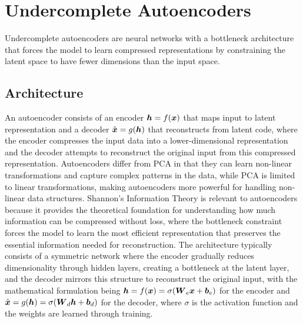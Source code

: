 
\section{Undercomplete Autoencoders }
\label{sec:undercomplete-ae}

Undercomplete autoencoders are neural networks with a bottleneck architecture that forces the model to learn compressed representations by constraining the latent space to have fewer dimensions than the input space.

\subsection{Architecture}

An autoencoder consists of an encoder $\boldsymbol{h} = f(\boldsymbol{x})$ that maps input to latent representation and a decoder $\hat{\boldsymbol{x}} = g(\boldsymbol{h})$ that reconstructs from latent code, where the encoder compresses the input data into a lower-dimensional representation and the decoder attempts to reconstruct the original input from this compressed representation. Autoencoders differ from PCA in that they can learn non-linear transformations and capture complex patterns in the data, while PCA is limited to linear transformations, making autoencoders more powerful for handling non-linear data structures. Shannon's Information Theory is relevant to autoencoders because it provides the theoretical foundation for understanding how much information can be compressed without loss, where the bottleneck constraint forces the model to learn the most efficient representation that preserves the essential information needed for reconstruction. The architecture typically consists of a symmetric network where the encoder gradually reduces dimensionality through hidden layers, creating a bottleneck at the latent layer, and the decoder mirrors this structure to reconstruct the original input, with the mathematical formulation being $\boldsymbol{h} = f(\boldsymbol{x}) = \sigma(\boldsymbol{W}_e \boldsymbol{x} + \boldsymbol{b}_e)$ for the encoder and $\hat{\boldsymbol{x}} = g(\boldsymbol{h}) = \sigma(\boldsymbol{W}_d \boldsymbol{h} + \boldsymbol{b}_d)$ for the decoder, where $\sigma$ is the activation function and the weights are learned through training.

